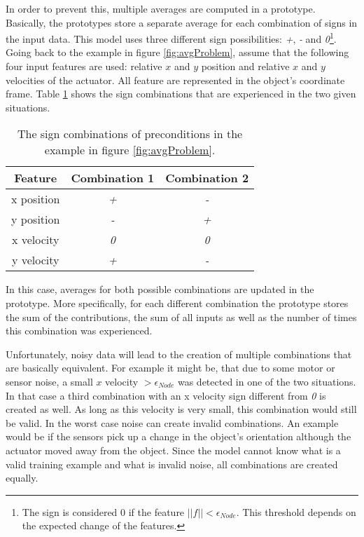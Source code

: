 In order to prevent this, multiple averages are computed in a prototype. Basically, the prototypes store a separate average for each combination of signs in the input data. This model uses three different sign possibilities: \textit{+}, \textit{-} and \textit{0}\footnote{The sign is considered 0 if the feature $||f|| < \epsilon_{Node}$. This threshold depends on the expected change of the features.}.
Going back to the example in figure \ref{fig:avgProblem}, assume that the following four input features are used: relative $x$ and $y$ position and relative $x$ and $y$ velocities of the actuator. All feature are represented in the object's coordinate frame. Table \ref{tab:signCombinations} shows the sign combinations that are experienced in the two given situations. 

\begin{table}
	\centering
	\begin{tabular}{|c|c|c|}
		\hline Feature & Combination 1 & Combination 2 \\ 
		\hline x position & \textit{+} & \textit{-} \\ 
		\hline y position & \textit{-} & \textit{+} \\ 
		\hline x velocity & \textit{0} & \textit{0} \\
		\hline y velocity & \textit{+} & \textit{-} \\ 
		\hline 
	\end{tabular} 
	\caption{The sign combinations of preconditions in the example in figure \ref{fig:avgProblem}.}
	\label{tab:signCombinations}
\end{table}

In this case, averages for both possible combinations are updated in the prototype. More specifically, for each different combination the prototype stores the sum of the contributions, the sum of all inputs as well as the number of times this combination was experienced. 

Unfortunately, noisy data will lead to the creation of multiple combinations that are basically equivalent. For example it might be, that due to some motor or sensor noise, a small $x$ velocity $>\epsilon_{Node}$ was detected in one of the two situations. In that case a third combination with an x velocity sign different from \textit{0} is created as well. As long as this velocity is very small, this combination would still be valid. In the worst case noise can create invalid combinations. An example would be if the sensors pick up a change in the object's orientation although the actuator moved away from the object. Since the model cannot know what is a valid training example and what is invalid noise, all combinations are created equally.

